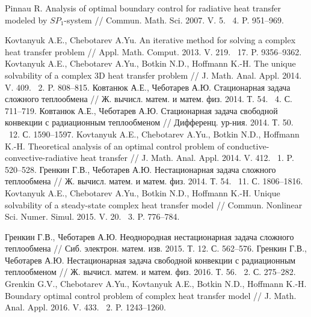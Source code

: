 \documentclass[12pt]{article}
\begin{document}
    \begin{thebibliography}{999}

        Pinnau R. Analysis of optimal boundary control for radiative heat transfer modeled by $SP_1$-system //
        Commun. Math. Sci. 2007. V. 5. \textnumero~4. P. 951--969.

        Kovtanyuk A.E., Chebotarev A.Yu. An iterative method for solving a complex heat transfer problem // Appl. Math. Comput. 2013. V. 219. \textnumero~17. P. 9356--9362.
        Kovtanyuk A.E., Chebotarev A.Yu., Botkin N.D., Hoffmann K.-H. The unique solvability of a complex 3D heat transfer problem // J. Math. Anal. Appl. 2014. V. 409. \textnumero~2. P. 808--815.
        Ковтанюк А.Е., Чеботарев А.Ю. Стационарная задача сложного теплообмена // Ж. вычисл. матем. и матем. физ. 2014. Т. 54. \textnumero~4. С. 711--719.
        Ковтанюк А.Е., Чеботарев А.Ю. Стационарная задача свободной конвекции с радиационным теплообменом // Дифференц. ур-ния. 2014. Т. 50. \textnumero~12. С. 1590--1597.
        Kovtanyuk A.E., Chebotarev A.Yu., Botkin N.D., Hoffmann K.-H. Theoretical analysis of an optimal control problem of conductive-convective-radiative heat transfer // J. Math. Anal.
        Appl. 2014. V. 412. \textnumero~1. P. 520--528.
        Гренкин Г.В., Чеботарев А.Ю. Нестационарная задача сложного теплообмена // Ж. вычисл. матем. и матем. физ. 2014. Т. 54. \textnumero~11. С. 1806--1816.
        Kovtanyuk A.E., Chebotarev A.Yu., Botkin N.D., Hoffmann K.-H. Unique solvability of a steady-state complex heat transfer model // Commun. Nonlinear Sci. Numer. Simul. 2015. V. 20. \textnumero~3. P. 776--784.

        Гренкин Г.В., Чеботарев А.Ю. Неоднородная нестационарная задача сложного теплообмена // Сиб. электрон. матем. изв. 2015. Т. 12. С. 562--576.
        Гренкин Г.В., Чеботарев А.Ю. Нестационарная задача свободной конвекции с радиационным теплообменом // Ж. вычисл. матем. и матем. физ. 2016. Т. 56. \textnumero~2. С. 275--282.
        Grenkin G.V., Chebotarev A.Yu., Kovtanyuk A.E., Botkin N.D., Hoffmann K.-H. Boundary optimal control problem of complex heat transfer model // J. Math. Anal. Appl. 2016. V. 433. \textnumero~2. P. 1243--1260.




\end{thebibliography}
\end{document}
